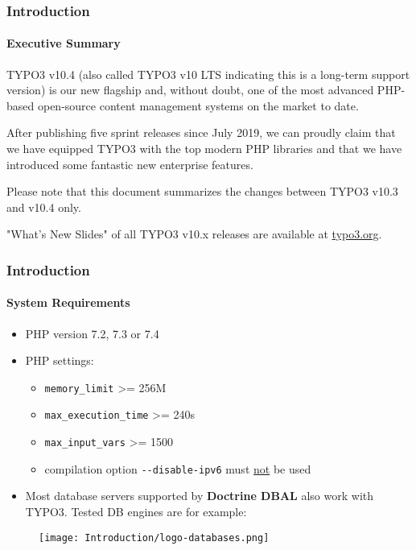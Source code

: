 \begin{frame}[fragile]
	\frametitle{Introduction}
	\framesubtitle{Executive Summary}

	\small
		TYPO3 v10.4 (also called TYPO3 v10 LTS indicating this is a long-term support version)
		is our new flagship and, without doubt, one of the most advanced PHP-based open-source
		content management systems on the market to date.

		\vspace{0.2cm}

		After publishing five sprint releases since July 2019, we can proudly claim that we
		have equipped TYPO3 with the top modern PHP libraries and that we have introduced some
		fantastic new enterprise features.

		\vspace{0.2cm}

		Please note that this document summarizes the changes between TYPO3 v10.3 and v10.4 only.

		\vspace{0.2cm}

		"What's New Slides" of all TYPO3 v10.x releases are available at
		\href{https://typo3.org/help/documentation/whats-new/}{typo3.org}.

	\normalsize

\end{frame}


\begin{frame}[fragile]
	\frametitle{Introduction}
	\framesubtitle{System Requirements}

	\begin{itemize}
		\item PHP version 7.2, 7.3 or 7.4
		\item PHP settings:

			\begin{itemize}
				\item \texttt{memory\_limit} >= 256M
				\item \texttt{max\_execution\_time} >= 240s
				\item \texttt{max\_input\_vars} >= 1500
				\item compilation option \texttt{-}\texttt{-disable-ipv6} must \underline{not} be used
			\end{itemize}

		\item Most database servers supported by \textbf{Doctrine DBAL} also work with TYPO3.
			Tested DB engines are for example:
	\end{itemize}

	\begin{figure}
		\texttt{[image: Introduction/logo-databases.png]}
	\end{figure}

\end{frame}

